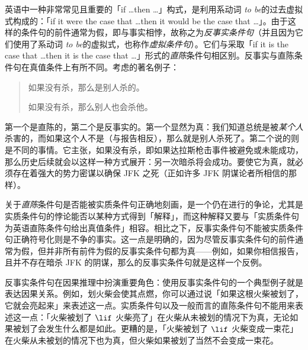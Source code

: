 \documentclass[../../../include/open-logic-section]{subfiles}
\begin{document}


英语中一种非常常见且重要的「if \dots then \dots」构式，是利用系动词
\textit{to be}的过去虚拟式构成的：「if it were the case that \dots then it would be the
case that \dots」。由于这样的条件句的前件通常为假，即与事实相悖，故称之为\emph{反事实条件句}（并且因为它们使用了系动词 \textit{to be}的虚拟式，也称作\emph{虚拟条件句}）。它们与采取「if it is the case that \dots then it is the case that \dots」形式的\emph{直陈}条件句相区别。反事实与直陈条件句在真值条件上有所不同。考虑的著名例子：
\begin{quote}
  如果没有杀，那么是别人杀的。

  如果没有杀，那么别人也会杀他。
\end{quote}
第一个是直陈的，第二个是反事实的。第一个显然为真：我们知道总统是被\emph{某个人}杀害的，而如果这个人不是（与报告相反），那么就是别人杀死了。第二个说的则是不同的事情。它主张，如果没有杀，即如果达拉斯枪击事件被避免或未能成功，那么历史后续就会以这样一种方式展开：另一次暗杀将会成功。要使它为真，就必须存在着强大的势力密谋以确保 JFK 之死（正如许多 JFK 阴谋论者所相信的那样）。

关于\emph{直陈}条件句是否能被实质条件句正确地刻画，是一个仍在进行的争论，尤其是实质条件句的悖论能否以某种方式得到「解释」，而这种解释又要与「实质条件句为英语直陈条件句给出真值条件」相容。相比之下，反事实条件句不能被实质条件句正确符号化则是不争的事实。这一点是明确的，因为尽管反事实条件句的前件通常为假，但并非所有前件为假的反事实条件句都为真——例如，如果你相信报告，且并不存在暗杀 JFK 的阴谋，那么的反事实条件句就是这样一个反例。

反事实条件句在因果推理中扮演重要角色：使用反事实条件句的一个典型例子就是表达因果关系。例如，划火柴会使其点燃，你可以通过说「如果这根火柴被划了，它就会亮起来」来表述这一点。实质条件句以及一般而言的直陈条件句不能用来表述这一点：「火柴被划了 $\lif$ 火柴亮了」在火柴从未被划的情况下为真，无论如果被划了会发生什么都是如此。更糟的是，「火柴被划了 $\lif$ 火柴变成一束花」在火柴从未被划的情况下也为真，但火柴如果被划了当然不会变成一束花。
\end{document}

